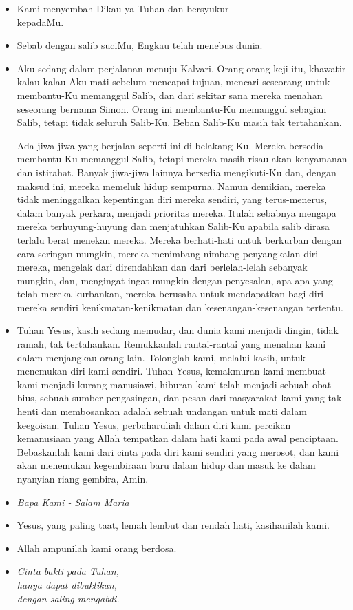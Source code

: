 \documentclass[a5paper,headsepline,titlepage,10pt,nnormalheadings,DIVcalc]{scrbook}
\newcommand{\BU}[1]{\begin{itemize} \item[U:] #1 \end{itemize}}
\newcommand{\BP}[1]{\begin{itemize} \item[P:] #1 \end{itemize}}
\newcommand{\kamiMenyembah}{\BP{ Kami menyembah Dikau ya Tuhan dan bersyukur\\kepadaMu.}
\BU{ Sebab dengan salib suciMu, Engkau telah menebus dunia.}
}
\newcommand{\kasihanilahKami}{\BP{Yesus, yang paling taat, lemah lembut dan rendah hati, kasihanilah kami.}
\BU{Allah ampunilah kami orang berdosa.}}
\begin{document}
\kamiMenyembah
\BP{Aku sedang dalam perjalanan menuju Kalvari. Orang-orang keji itu, khawatir kalau-kalau Aku mati sebelum mencapai tujuan, mencari seseorang untuk membantu-Ku memanggul Salib, dan dari sekitar sana mereka menahan seseorang bernama Simon. Orang ini membantu-Ku memanggul sebagian Salib, tetapi tidak seluruh Salib-Ku. Beban Salib-Ku masih tak tertahankan.

Ada jiwa-jiwa yang berjalan seperti ini di belakang-Ku. Mereka bersedia membantu-Ku memanggul Salib, tetapi mereka masih risau akan kenyamanan dan istirahat. Banyak jiwa-jiwa lainnya bersedia mengikuti-Ku dan, dengan maksud ini, mereka memeluk hidup sempurna. Namun demikian, mereka tidak meninggalkan kepentingan diri mereka sendiri, yang terus-menerus, dalam banyak perkara, menjadi prioritas mereka. Itulah sebabnya mengapa mereka terhuyung-huyung dan menjatuhkan Salib-Ku apabila salib dirasa terlalu berat menekan mereka. Mereka berhati-hati untuk berkurban dengan cara seringan mungkin, mereka menimbang-nimbang penyangkalan diri mereka, mengelak dari direndahkan dan dari berlelah-lelah sebanyak mungkin, dan, mengingat-ingat mungkin dengan penyesalan, apa-apa yang telah mereka kurbankan, mereka berusaha untuk mendapatkan bagi diri mereka sendiri kenikmatan-kenikmatan dan kesenangan-kesenangan tertentu.}

\BU{Tuhan Yesus, kasih sedang memudar, dan dunia kami menjadi dingin, tidak ramah, tak tertahankan. Remukkanlah rantai-rantai yang menahan kami dalam menjangkau orang lain. Tolonglah kami, melalui kasih, untuk menemukan diri kami sendiri. Tuhan Yesus, kemakmuran kami membuat kami menjadi kurang manusiawi, hiburan kami telah menjadi sebuah obat bius, sebuah sumber pengasingan, dan pesan dari masyarakat kami yang tak henti dan membosankan adalah sebuah undangan untuk mati dalam keegoisan. Tuhan Yesus, perbaharuliah dalam diri kami percikan kemanusiaan yang Allah tempatkan dalam hati kami pada awal penciptaan. Bebaskanlah kami dari cinta pada diri kami sendiri yang merosot, dan kami akan menemukan kegembiraan baru dalam hidup dan masuk ke dalam nyanyian riang gembira, Amin.}

\large\begin{itemize}\item[~]\it{Bapa Kami - Salam Maria}\end{itemize}\normalsize
\kasihanilahKami

\begin{itemize}
\item[6.] \it{Cinta bakti pada Tuhan,\\ 
	hanya dapat dibuktikan, \\
	dengan saling mengabdi.}
\end{itemize}
\end{document}
